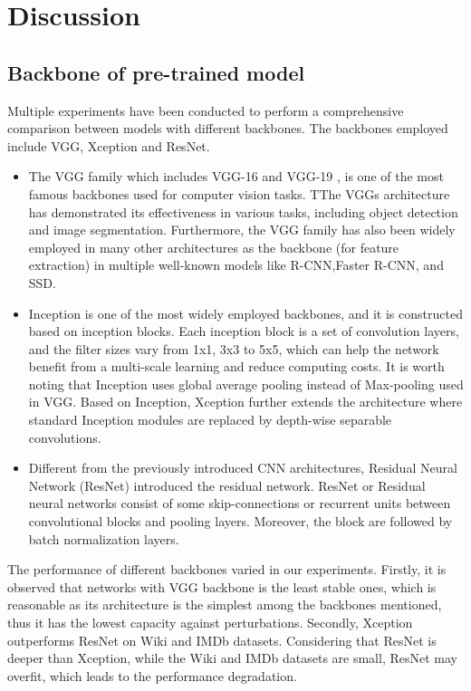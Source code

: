 \documentclass[DIV=calc, paper=a4, fontsize=10pt, twocolumn]{article}
\begin{document}
	
	\section{Discussion} 
	\subsection{Backbone of pre-trained model}
	
	Multiple experiments have been conducted to perform a comprehensive comparison between models with different backbones. The backbones employed include VGG, Xception and ResNet.
	
	\begin{itemize}
		\item The VGG family which includes VGG-16 and VGG-19 \cite{simonyan2014very}, is one of the most famous backbones used for computer vision tasks. TThe VGGs architecture has demonstrated its effectiveness in various tasks, including object detection and image segmentation. Furthermore, the VGG family has also been widely employed in many other architectures as the backbone (for feature extraction) in multiple well-known models like R-CNN,Faster R-CNN, and SSD.
		\item Inception is one of the most widely employed backbones, and it is constructed based on inception blocks. Each inception block is a set of convolution layers, and the filter sizes vary from 1x1, 3x3 to 5x5, which can help the network benefit from a multi-scale learning and reduce computing costs. It is worth noting that Inception uses global average pooling instead of Max-pooling used in VGG. Based on Inception, Xception \cite{chollet2017xception} further extends the architecture where standard Inception modules are replaced by depth-wise separable convolutions.
		\item Different from the previously introduced CNN architectures, Residual Neural Network \cite{he2016deep} (ResNet) introduced the residual network. ResNet or Residual neural networks consist of some skip-connections or recurrent units between convolutional blocks and pooling layers. Moreover, the block are followed by batch normalization layers.
	\end{itemize}
	
	The performance of different backbones varied in our experiments. Firstly, it is observed that networks with VGG backbone is the least stable ones, which is reasonable as its architecture is the simplest among the backbones mentioned, thus it has the lowest capacity against perturbations. Secondly, Xception outperforms ResNet on Wiki and IMDb datasets. Considering that ResNet is deeper than Xception, while the Wiki and IMDb datasets are small, ResNet may overfit, which leads to the performance degradation. 
	
\end{document}
